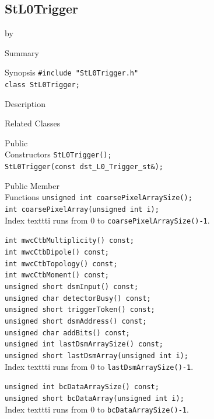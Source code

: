\documentclass[twoside]{article}
\newcommand{\entrylabel}[1]{\mbox{\textbf{{#1}}}\hfil}%
\newenvironment{entry}
{\begin{list}{}%
    {\renewcommand{\makelabel}{\entrylabel}%
     \setlength{\labelwidth}{90pt}%
     \setlength{\leftmargin}{\labelwidth}
     \advance\leftmargin by \labelsep%
      }%
    }%
  {\end{list}}
\newcommand{\Entrylabel}[1]%
{\raisebox{0pt}[1ex][0pt]{\makebox[\labelwidth][l]%
    {\parbox[t]{\labelwidth}{\hspace{0pt}\textbf{{#1}}}}}}
\newenvironment{Entry}%
{\renewcommand{\entrylabel}{\Entrylabel}\begin{entry}}%
  {\end{entry}}
\begin{document}
\subsection{StL0Trigger}
\label{sec:StL0Trigger}
\begin{Entry}
\item[Summary]
\item[Synopsis]
    \verb+#include "StL0Trigger.h"+\\
    \verb+class StL0Trigger;+\\
\item[Description]
\item[Related Classes]
\item[Public\\ Constructors]
    \verb+StL0Trigger();+\\
    \verb+StL0Trigger(const dst_L0_Trigger_st&);+\\
\item[Public Member\\ Functions]
    \verb+unsigned int coarsePixelArraySize();+\\
    \verb+int coarsePixelArray(unsigned int i);+\\
    Index texttt{i} runs from 0 to \texttt{coarsePixelArraySize()-1}.
    
    \verb+int mwcCtbMultiplicity() const;+\\
    \verb+int mwcCtbDipole() const;+\\
    \verb+int mwcCtbTopology() const;+\\
    \verb+int mwcCtbMoment() const;+\\
    \verb+unsigned short dsmInput() const;+\\
    \verb+unsigned char detectorBusy() const;+\\ 
    \verb+unsigned short triggerToken() const;+\\
    \verb+unsigned short dsmAddress() const;+\\  
    \verb+unsigned char addBits() const;+\\
    \verb+unsigned int lastDsmArraySize() const;+\\
    \verb+unsigned short lastDsmArray(unsigned int i);+\\
    Index texttt{i} runs from 0 to \texttt{lastDsmArraySize()-1}.
    
    \verb+unsigned int bcDataArraySize() const;+\\
    \verb+unsigned short bcDataArray(unsigned int i);+\\
    Index texttt{i} runs from 0 to \texttt{bcDataArraySize()-1}.
    

\end{Entry}
\end{document}
